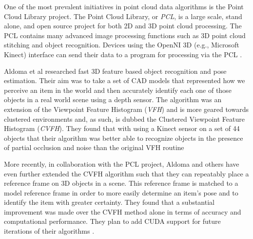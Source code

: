One of the most prevalent initiatives in point cloud data algorithms is the Point Cloud Library project. The Point Cloud Library, or \emph{PCL}, is a large scale, stand alone, and open source project for both 2D and 3D point cloud processing. The PCL contains many advanced image processing functions such as 3D point cloud stitching and object recognition. Devices using the OpenNI 3D (e.g., Microsoft Kinect) interface can send their data to a program  for processing via the PCL \cite{PCL2012}.

Aldoma et al researched fast 3D feature based object recognition and pose estimation. Their aim was to take a set of CAD models that represented how we perceive an item in the world and then accurately identify each one of those objects in a real world scene using a depth sensor. The algorithm was an extension of the Viewpoint Feature Histogram (\emph{VFH}) and is more geared towards clustered environments and, as such, is dubbed the Clustered Viewpoint Feature Histogram (\emph{CVFH}). They found that with using a Kinect sensor on a set of 44 objects that their algorithm was better able to recognize objects in the presence of partial occlusion and noise than the original VFH routine \cite{Aldoma2011}

More recently, in collaboration with the PCL project, Aldoma and others have even further extended the CVFH algorithm such that they can repeatably place a reference frame on 3D objects in a scene. This reference frame is matched to a model reference frame in order to more easily determine an item's pose and to identify the item with greater certainty. They found that a substantial improvement was made over the CVFH method alone in terms of accuracy and computational performance. They plan to add CUDA support for future iterations of their algorithms \cite{Aldoma2012}.